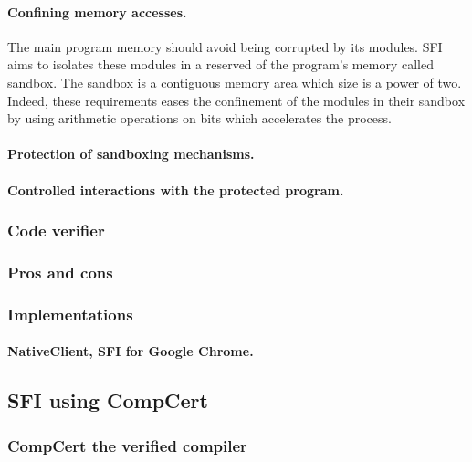 \documentclass[11pt]{sdm}
\begin{document}
\paragraph{Confining memory accesses.}
\label{par:Confining memory accesses}
The main program memory should avoid being corrupted by its modules. SFI aims to isolates these modules in a reserved of the program's memory called sandbox.
The sandbox is a contiguous memory area which size is a power of two. Indeed, these requirements eases the confinement of the modules in their sandbox by using arithmetic operations on bits which accelerates the process.
\paragraph{Protection of sandboxing mechanisms.}
\label{par:Protection of sandboxing mechanisms}
\paragraph{Controlled interactions with the protected program.}
\label{par:Controled interactions with the protected program}

\subsubsection{Code verifier}
\label{ssub:Code verifier}

\subsubsection{Pros and cons}
\label{ssub:Pros and cons}

\subsubsection{Implementations}
\label{ssub:Implementations}
\paragraph{NativeClient, SFI for Google Chrome.}
\label{par:NativeClient, SFI for Google Chrome}


\subsection{SFI using CompCert}
\label{sub:sfi_comp}


\subsubsection{CompCert the verified compiler}
\label{ssub:CompCert the verified compiler}
\end{document}
